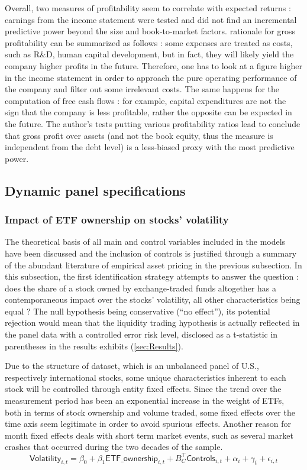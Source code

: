 Overall, two measures of profitability seem to correlate with expected returns : earnings from the income statement were tested and \textcite{Fama2006} did not find an incremental predictive power beyond the size and book-to-market factors. \textcite{Novy-Marx2013} rationale for gross profitability can be summarized as follows : some expenses are treated as costs, such as R\&D, human capital development, but in fact, they will likely yield the company higher profits in the future. Therefore, one has to look at a figure higher in the income statement in order to approach the pure operating performance of the company and filter out some irrelevant costs. The same happens for the computation of free cash flows : for example, capital expenditures are not the sign that the company is less profitable, rather the opposite can be expected in the future. The author's tests putting various profitability ratios lead to conclude that gross profit over assets (and not the book equity, thus the measure is independent from the debt level) is a less-biased proxy with the most predictive power.


\subsection{Dynamic panel specifications}
\subsubsection{Impact of ETF ownership on stocks' volatility}
\label{subsec:Method:Volatility}
The theoretical basis of all main and control variables included in the models have been discussed and the inclusion of controls is justified through a summary of the abundant literature of empirical asset pricing in the previous subsection. In this subsection, the first identification strategy attempts to answer the question : does the share of a stock owned by exchange-traded funds altogether has a contemporaneous impact over the stocks' volatility, all other characteristics being equal ? The null hypothesis being conservative (``no effect''), its potential rejection would mean that the liquidity trading hypothesis is actually reflected in the panel data with a controlled error risk level, disclosed as a t-statistic in parentheses in the results exhibits (\autoref{sec:Results}).

Due to the structure of dataset, which is an unbalanced panel of U.S., respectively international stocks, some unique characteristics inherent to each stock will be controlled through entity fixed effects. Since the trend over the measurement period has been an exponential increase in the weight of ETFs, both in terms of stock ownership and volume traded, some fixed effects over the time axis seem legitimate in order to avoid spurious effects. Another reason for month fixed effects deals with short term market events, such as several market crashes that occurred during the two decades of the sample. 
\begin{equation}
  \mathsf{Volatility}_{i,t} = \beta_{0} + \beta_{1} \mathsf{ETF\_ownership}_{i, t} + B_{C}^{\intercal} \mathsf{Controls}_{i, t} + \alpha_{i} + \gamma_{t} + \epsilon_{i, t}
\end{equation}


